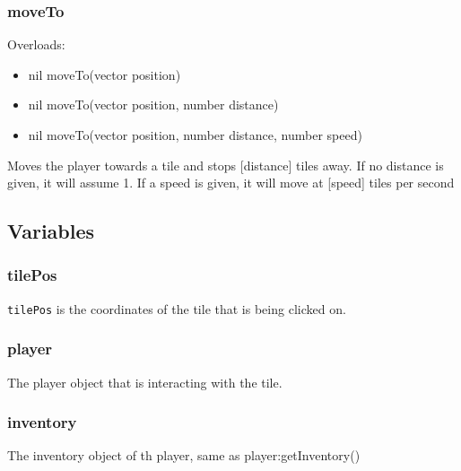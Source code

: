 \documentclass{book}
\newenvironment{ulist}
	{\begin{itemize}
			\itemsep0em}
	{\end{itemize}}
\begin{document}
\subsubsection{moveTo}
Overloads:
\begin{ulist}
	\item nil moveTo(vector position)
	\item nil moveTo(vector position, number distance)
	\item nil moveTo(vector position, number distance, number speed)
\end{ulist}
Moves the player towards a tile and stops [distance] tiles away. If no distance is given, it will assume 1. If a speed is given, it will move at [speed] tiles per second

\subsection{Variables}
\subsubsection{tilePos}
\texttt{tilePos} is the coordinates of the tile that is being clicked on.

\subsubsection{player}
The player object that is interacting with the tile.

\subsubsection{inventory}
The inventory object of th player, same as player:getInventory()
\end{document}
